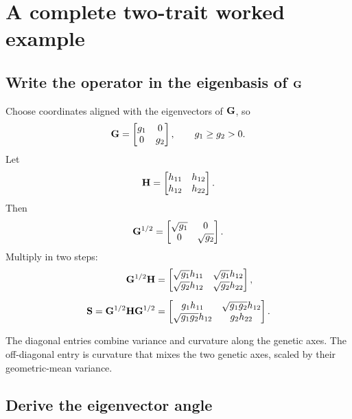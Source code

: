 \chapter{A complete two-trait worked example}

\section{Write the operator in the eigenbasis of \(\mathbf{G}\)}

Choose coordinates aligned with the eigenvectors of \(\mathbf{G}\), so
\begin{equation}
\mathbf{G}=
\begin{bmatrix}
g_1&0\\0&g_2
\end{bmatrix},
\qquad g_1\ge g_2>0.
\end{equation}
Let
\begin{equation}
\mathbf{H}=
\begin{bmatrix}
h_{11}&h_{12}\\h_{12}&h_{22}
\end{bmatrix}.
\end{equation}
Then
\begin{equation}
\mathbf{G}^{1/2}=
\begin{bmatrix}
\sqrt{g_1}&0\\0&\sqrt{g_2}
\end{bmatrix}.
\end{equation}
Multiply in two steps:
\begin{align}
\mathbf{G}^{1/2}\mathbf{H}
&=
\begin{bmatrix}
\sqrt{g_1}h_{11}&\sqrt{g_1}h_{12}\\
\sqrt{g_2}h_{12}&\sqrt{g_2}h_{22}
\end{bmatrix},\\[0.5em]
\mathbf{S}=\mathbf{G}^{1/2}\mathbf{H}\mathbf{G}^{1/2}
&=
\begin{bmatrix}
g_1h_{11}&\sqrt{g_1g_2}h_{12}\\
\sqrt{g_1g_2}h_{12}&g_2h_{22}
\end{bmatrix}.
\label{eq:S2D}
\end{align}

\inwords The diagonal entries combine variance and curvature along the genetic axes. The off-diagonal entry is curvature that mixes the two genetic axes, scaled by their geometric-mean variance.

\section{Derive the eigenvector angle}

